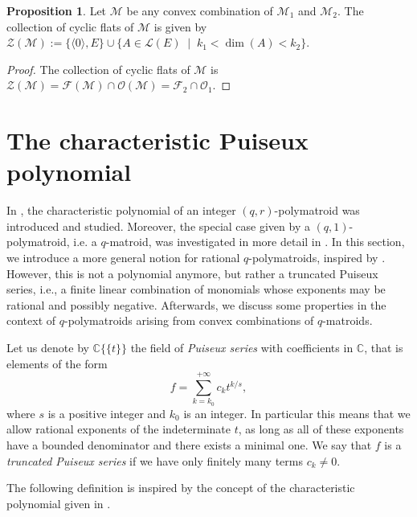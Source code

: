 \documentclass[a4paper,11pt,reqno]{amsart}
\theoremstyle{definition}
\newtheorem{proposition}[theorem]{{{Proposition}}}
\newcommand{\mM}{\mathcal{M}}
\newcommand{\mL}{\mathcal{L}}
\newcommand{\mF}{\mathcal{F}}
\newcommand{\mO}{\mathcal{O}}
\newcommand{\mZ}{\mathcal{Z}}
\begin{document}
{\begin{proposition}\label{prop:cyc_flats_uniform}
Let $\mM$ be any convex combination of $\mM_1$ and $\mM_2$. 
    The collection of cyclic flats of $\mM$ is given by $\mZ(\mM) := \{\langle 0 \rangle , E\} \cup \{A \in\mL(E) \;\mid\; k_1< \dim(A) < k_2\}$. 
\end{proposition}
\begin{proof}
    The collection of cyclic flats of $\mM$ is $\mZ(\mM) = \mF(\mM) \cap \mO(\mM) = \mF_2 \cap\mO_1$.
\end{proof}



\section{The characteristic Puiseux  polynomial}\label{sec: Puiseux_polyn}


In \cite[Sec.~3]{byrne2024weighted}, the characteristic polynomial of an integer $(q,r)$-polymatroid was introduced and studied. Moreover, the special case given by a $(q,1)$-polymatroid, i.e. a $q$-matroid, was investigated in more detail in \cite[Sec.~5]{jany2023proj_matroid}. In this section, we introduce a more general notion for rational $q$-polymatroids, inspired by \cite{byrne2024weighted}. However, this is not a polynomial anymore, but rather a truncated Puiseux series, i.e., a finite linear combination of monomials whose exponents may be rational and possibly negative.
Afterwards, we discuss some properties in the context of $q$-polymatroids arising from convex combinations of $q$-matroids.

Let us denote by $\mathbb{C}\{\!\{t\}\!\}$ the field of \emph{Puiseux series} with coefficients in $\mathbb{C}$, that is elements of the form
\[
    f=\sum_{k=k_0}^{+\infty}c_kt^{k/s},
\]
where $s$ is a positive integer and $k_0$ is an integer. In particular this means that we allow rational exponents of the indeterminate $t$, as long as all of these exponents have a bounded denominator and there exists a minimal one. We say that $f$ is a \emph{truncated Puiseux series} if we have only finitely many terms $c_k\neq 0$. 

The following definition is inspired by the concept of the characteristic polynomial given in \cite[Def. 23]{byrne2024weighted}.

}
\end{document}
